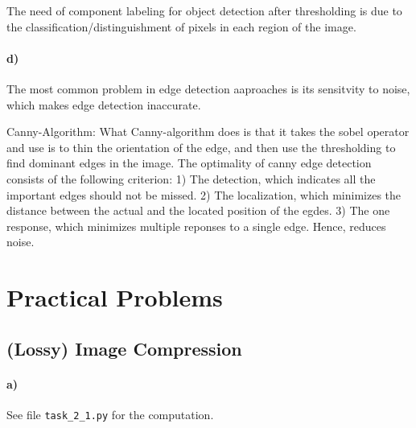 \documentclass[a4paper,twocolumn]{article}
\begin{document}
	The need of component labeling for object detection after thresholding is due to the classification/distinguishment of pixels in each region of the image.
	
	\paragraph{d)} %

	The most common problem in edge detection aaproaches is its sensitvity to noise, which makes edge detection inaccurate.
	
	Canny-Algorithm:
	What Canny-algorithm does is that it takes the sobel operator and use is to thin the orientation of the edge, and then use the thresholding to find dominant edges in the image.
	The optimality of canny edge detection consists of the following criterion:
	1) The detection, which indicates all the important edges should not be missed.
	2) The localization, which minimizes the distance between the actual and the located position of the egdes.
	3) The one response, which minimizes multiple reponses to a single edge. Hence, reduces noise.
	
	
	\section{Practical Problems}
	
	\subsection{(Lossy) Image Compression}
	
	\paragraph{a)} See file \texttt{task\_2\_1.py} for the computation.
	
\end{document}
